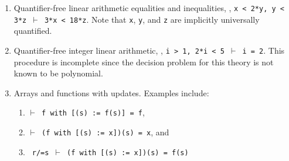 \documentclass[12pt,twoside]{book}
\begin{document}
\begin{description}
\begin{enumerate}
\item Quantifier-free linear arithmetic equalities and inequalities, \eg,
\texttt{x < 2*y, y < 3*z $\vdash$ 3*x < 18*z}.  Note that \texttt{x},
\texttt{y}, and \texttt{z} are implicitly universally quantified.


\item Quantifier-free integer linear arithmetic, \eg, \texttt{i > 1, 2*i <
5 $\vdash$ i = 2}.  This procedure is incomplete since the decision
problem for this theory is not known to be polynomial.

\item Arrays and functions with updates.  Examples include:
\begin{enumerate}
\item  \texttt{$\vdash$ f with [(s) := f(s)] = f},
\item  \texttt{$\vdash$ (f with [(s) := x])(s) = x}, and
\item  \texttt{ r/=s $\vdash$ (f with [(s) := x])(s) = f(s)}
\end{enumerate}
\end{enumerate}


\end{description}
\end{document}
